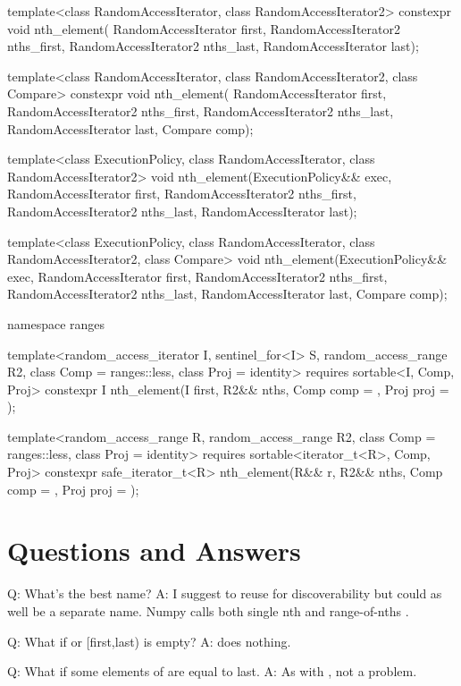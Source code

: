 \begin{codeblockAdd}
template<class RandomAccessIterator, class RandomAccessIterator2>
constexpr void nth_element(
RandomAccessIterator first, 
RandomAccessIterator2 nths_first, RandomAccessIterator2 nths_last,
RandomAccessIterator last);

template<class RandomAccessIterator, class RandomAccessIterator2, class Compare>
constexpr void nth_element(
RandomAccessIterator first, 
RandomAccessIterator2 nths_first, RandomAccessIterator2 nths_last,
RandomAccessIterator last, Compare comp);

template<class ExecutionPolicy, class RandomAccessIterator, class RandomAccessIterator2>
void nth_element(ExecutionPolicy&& exec,
RandomAccessIterator first, 
RandomAccessIterator2 nths_first, RandomAccessIterator2 nths_last,
RandomAccessIterator last);

template<class ExecutionPolicy, class RandomAccessIterator,
class RandomAccessIterator2, class Compare>
void nth_element(ExecutionPolicy&& exec,
RandomAccessIterator first, 
RandomAccessIterator2 nths_first, RandomAccessIterator2 nths_last,
RandomAccessIterator last, Compare comp);

namespace ranges {
  template<random_access_iterator I, sentinel_for<I> S, 
  random_access_range R2, class Comp = ranges::less, class Proj = identity>
  requires sortable<I, Comp, Proj>
  constexpr I nth_element(I first, R2&& nths, Comp comp = {}, Proj proj = {});

  template<random_access_range R, 
  random_access_range R2,
  class Comp = ranges::less, class Proj = identity>
  requires sortable<iterator_t<R>, Comp, Proj>
  constexpr safe_iterator_t<R>
  nth_element(R&& r, R2&& nths, Comp comp = {}, Proj proj = {});
}
\end{codeblockAdd}


\section{Questions and Answers}

Q: What's the best name? A: I suggest to reuse  for discoverability but could as well be a separate name. Numpy calls both single nth and range-of-nths .

Q: What if  or [first,last) is empty? A:  does nothing.

Q: What if some elements of  are equal to last. A: As with , not a problem.

